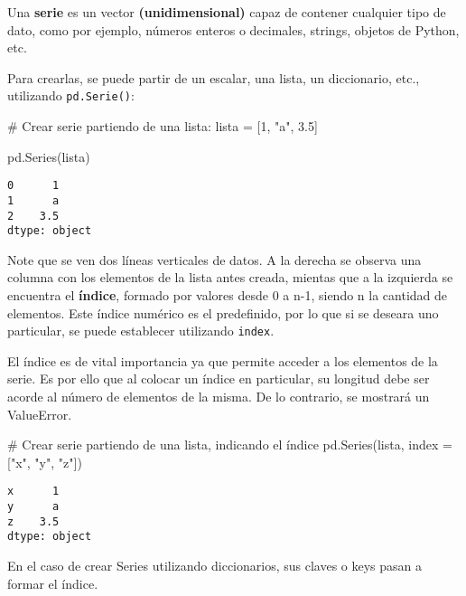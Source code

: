 \documentclass[
  letterpaper,
  DIV=11,
  numbers=noendperiod]{scrreprt}
\newenvironment{Shaded}{\begin{snugshade}}{\end{snugshade}}
\newcommand{\CommentTok}[1]{\textcolor[rgb]{0.37,0.37,0.37}{#1}}
\newcommand{\DecValTok}[1]{\textcolor[rgb]{0.68,0.00,0.00}{#1}}
\newcommand{\FloatTok}[1]{\textcolor[rgb]{0.68,0.00,0.00}{#1}}
\newcommand{\NormalTok}[1]{\textcolor[rgb]{0.00,0.23,0.31}{#1}}
\newcommand{\OperatorTok}[1]{\textcolor[rgb]{0.37,0.37,0.37}{#1}}
\newcommand{\StringTok}[1]{\textcolor[rgb]{0.13,0.47,0.30}{#1}}
\begin{document}
Una \textbf{serie} es un vector \textbf{(unidimensional)} capaz de
contener cualquier tipo de dato, como por ejemplo, números enteros o
decimales, strings, objetos de Python, etc.

Para crearlas, se puede partir de un escalar, una lista, un diccionario,
etc., utilizando \texttt{pd.Serie()}:

\begin{Shaded}
\begin{Highlighting}[]
\CommentTok{\# Crear serie partiendo de una lista:}
\NormalTok{lista }\OperatorTok{=}\NormalTok{ [}\DecValTok{1}\NormalTok{, }\StringTok{"a"}\NormalTok{, }\FloatTok{3.5}\NormalTok{]}

\NormalTok{pd.Series(lista)}
\end{Highlighting}
\end{Shaded}

\begin{verbatim}
0      1
1      a
2    3.5
dtype: object
\end{verbatim}

Note que se ven dos líneas verticales de datos. A la derecha se observa
una columna con los elementos de la lista antes creada, mientas que a la
izquierda se encuentra el \textbf{índice}, formado por valores desde 0 a
n-1, siendo n la cantidad de elementos. Este índice numérico es el
predefinido, por lo que si se deseara uno particular, se puede
establecer utilizando \texttt{index}.

El índice es de vital importancia ya que permite acceder a los elementos
de la serie. Es por ello que al colocar un índice en particular, su
longitud debe ser acorde al número de elementos de la misma. De lo
contrario, se mostrará un ValueError.

\begin{Shaded}
\begin{Highlighting}[]
\CommentTok{\# Crear serie partiendo de una lista, indicando el índice}
\NormalTok{pd.Series(lista, index }\OperatorTok{=}\NormalTok{ [}\StringTok{"x"}\NormalTok{, }\StringTok{"y"}\NormalTok{, }\StringTok{"z"}\NormalTok{])}
\end{Highlighting}
\end{Shaded}

\begin{verbatim}
x      1
y      a
z    3.5
dtype: object
\end{verbatim}

En el caso de crear Series utilizando diccionarios, sus claves o keys
pasan a formar el índice.
\end{document}

